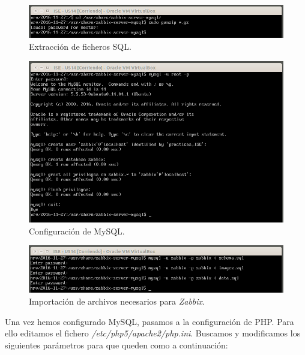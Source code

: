 \documentclass[a4paper,titlepage,12pt]{report}	%
\numberwithin{figure}{section} %
\numberwithin{table}{section} %
\begin{document}
	\begin{figure}[H]
	   \includegraphics[width=\linewidth]{./Imagenes/P3/O4-4.png}
	   \vspace{-0.5cm}
	   \caption[Extracción de ficheros SQL.]{Extracción de ficheros SQL.}
	   \label{P3-O4-4}
	\end{figure}

	\begin{figure}[H]
	   \includegraphics[width=\linewidth]{./Imagenes/P3/O4-5.png}
	   \vspace{-0.5cm}
	   \caption[Configuración de MySQL.]{Configuración de MySQL.}
	   \label{P3-O4-5}
	\end{figure}

	\begin{figure}[H]
	   \includegraphics[width=\linewidth]{./Imagenes/P3/O4-6.png}
	   \vspace{-0.5cm}
	   \caption[Importación de archivos necesarios para \textit{Zabbix}.]{Importación de archivos necesarios para \textit{Zabbix}.}
	   \label{P3-O4-6}
	\end{figure}

	Una vez hemos configurado MySQL, pasamos a la configuración de PHP. Para ello editamos el fichero \textit{/etc/php5/apache2/php.ini}. Buscamos y modificamos los siguientes parámetros para que queden como a continuación:
\end{document}
